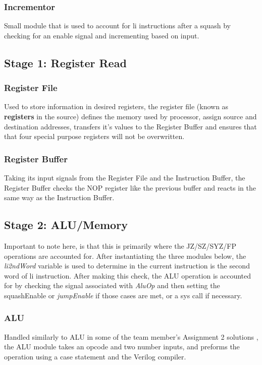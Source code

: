 \documentclass[conference]{IEEEtran}
\begin{document}
\subsubsection{Incrementor}
Small module that is used to account for li instructions after a squash by checking 
for an enable signal and incrementing based on input.
 
\subsection{Stage 1: Register Read} 
\subsubsection{Register File}
Used to store information in desired registers, the register file (known as \textbf{registers}
in the source) defines the memory used by processor, assign source and destination addresses,
transfers it's values to the Register Buffer and ensures that that four special purpose 
registers will not be overwritten.

\subsubsection{Register Buffer}
Taking its input signals from the Register File and the Instruction Buffer, the Register
Buffer checks the NOP register like the previous buffer and reacts in the same way
as the Instruction Buffer. 



\subsection{Stage 2: ALU/Memory} 
Important to note here, is that this is primarily where the JZ/SZ/SYZ/FP operations 
are accounted for. After instantiating the three modules below, the \textit{li2ndWord} 
variable is used to determine in the current instruction is the second word of li
instruction. After making this check, the ALU operation is accounted for by checking 
the signal associated with \textit{AluOp} and then setting the squashEnable
or \textit{jumpEnable} if those cases are met, or a sys call if necessary. 

\subsubsection{ALU}
Handled similarly to ALU in some of the team member's Assignment 2 solutions , the 
ALU module takes an opcode and two number inputs, and preforms the operation 
using a case statement and the Verilog compiler.
\end{document}
